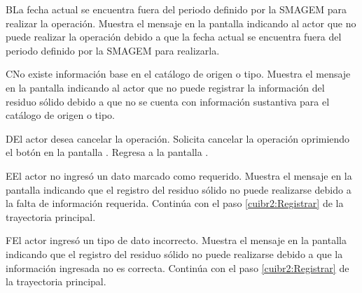    \begin{UCtrayectoriaA}{B}{La fecha actual se encuentra fuera del periodo definido por la SMAGEM para realizar la operación.}
    \UCpaso[\UCsist] Muestra el mensaje  en la pantalla  indicando al actor que no puede realizar la operación debido a que la fecha actual se encuentra fuera del periodo definido por la SMAGEM para realizarla. 
 \end{UCtrayectoriaA}
 
 \begin{UCtrayectoriaA}{C}{No existe información base en el catálogo de origen o tipo.}
    \UCpaso[\UCsist] Muestra el mensaje  en la pantalla  indicando al actor que no puede registrar la información del residuo sólido debido a que no se cuenta con información sustantiva para el catálogo de origen o tipo.
 \end{UCtrayectoriaA}
 
    \begin{UCtrayectoriaA}{D}{El actor desea cancelar la operación.}
    \UCpaso[\UCactor] Solicita cancelar la operación oprimiendo el botón  en la pantalla .
    \UCpaso[] Regresa a la pantalla . 
    \end{UCtrayectoriaA}
 
    \begin{UCtrayectoriaA}{E}{El actor no ingresó un dato marcado como requerido.}    
    \UCpaso[\UCsist] Muestra el mensaje  en la pantalla  indicando que el registro del residuo sólido no puede realizarse debido a la falta de información requerida.
    \UCpaso[] Continúa con el paso \ref{cuibr2:Registrar} de la trayectoria principal.     
    \end{UCtrayectoriaA}
 
        \begin{UCtrayectoriaA}{F}{El actor ingresó un tipo de dato incorrecto.}    
    \UCpaso[\UCsist] Muestra el mensaje  en la pantalla  indicando que el registro del residuo sólido no puede realizarse debido a que la información ingresada no es correcta.
    \UCpaso[] Continúa con el paso \ref{cuibr2:Registrar} de la trayectoria principal.     
    \end{UCtrayectoriaA}
    
